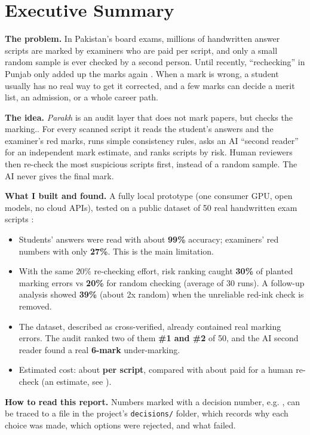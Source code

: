 \chapter*{Executive Summary}
\thispagestyle{plain}

\textbf{The problem.} In Pakistan's board exams, millions of handwritten answer scripts are marked by examiners who are
paid per script, and only a small random sample is ever checked by a second person. Until recently, ``rechecking''
in Punjab only added up the marks again \citep{techjuice2025remark}. When a mark is wrong, a student usually has no real
way to get it corrected, and a few marks can decide a merit list, an admission, or a whole career path.

\textbf{The idea.} \emph{Parakh} is an audit layer that does not mark papers, but checks the marking.. For every scanned script it
reads the student's answers and the examiner's red marks, runs simple consistency rules, asks an AI ``second reader''
for an independent mark estimate, and ranks scripts by risk. Human reviewers then re-check the most suspicious scripts
first, instead of a random sample. The AI never gives the final mark.

\textbf{What I built and found.} A fully local prototype (one consumer GPU, open models, no cloud APIs), tested on a public
dataset of 50 real handwritten exam scripts \citep{dataset2026}:
\begin{itemize}
  \item Students' answers were read with about \textbf{99\%} accuracy; examiners' red numbers with only \textbf{27\%}. This is the main limitation.
  \item With the same 20\% re-checking effort, risk ranking caught \textbf{30\%} of planted marking errors vs \textbf{20\%} for random checking
        (average of 30 runs). A follow-up analysis showed \textbf{39\%} (about 2x random) when the unreliable red-ink check is removed.
  \item The dataset, described as cross-verified, already contained real marking errors. The audit ranked two of them
        \textbf{\#1 and \#2} of 50, and the AI second reader found a real \textbf{6-mark} under-marking.
  \item Estimated cost: about \textbf{ per script}, compared with about  paid for a human re-check (an estimate, see ).
\end{itemize}

\textbf{How to read this report.} Numbers marked with a decision number, e.g. , can be traced to a file in the
project's \texttt{decisions/} folder, which records why each choice was made, which options were rejected, and what failed.
